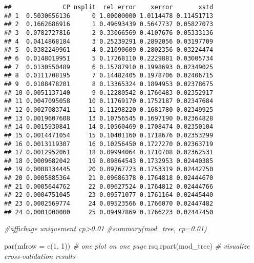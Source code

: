 \documentclass[
]{article}
\newenvironment{Shaded}{\begin{snugshade}}{\end{snugshade}}
\newcommand{\AttributeTok}[1]{\textcolor[rgb]{0.77,0.63,0.00}{#1}}
\newcommand{\CommentTok}[1]{\textcolor[rgb]{0.56,0.35,0.01}{\textit{#1}}}
\newcommand{\DecValTok}[1]{\textcolor[rgb]{0.00,0.00,0.81}{#1}}
\newcommand{\FunctionTok}[1]{\textcolor[rgb]{0.00,0.00,0.00}{#1}}
\newcommand{\NormalTok}[1]{#1}
\newcommand{\SpecialCharTok}[1]{\textcolor[rgb]{0.00,0.00,0.00}{#1}}
\begin{document}
\begin{Shaded}
\end{Shaded}

\begin{verbatim}
##              CP nsplit  rel error    xerror       xstd
## 1  0.5030656136      0 1.00000000 1.0114478 0.11451713
## 2  0.1662686916      1 0.49693439 0.5647737 0.05827073
## 3  0.0782727816      2 0.33066569 0.4107676 0.05333136
## 4  0.0414868184      3 0.25239291 0.2892056 0.03197709
## 5  0.0382249961      4 0.21090609 0.2802356 0.03224474
## 6  0.0148019951      5 0.17268110 0.2229881 0.03005734
## 7  0.0130550489      6 0.15787910 0.1998693 0.02349025
## 8  0.0111708195      7 0.14482405 0.1978706 0.02406715
## 9  0.0108478201      8 0.13365324 0.1894953 0.02378675
## 10 0.0051137140      9 0.12280542 0.1760483 0.02352917
## 11 0.0047095058     10 0.11769170 0.1752187 0.02347684
## 12 0.0027083741     11 0.11298220 0.1681780 0.02349925
## 13 0.0019607608     13 0.10756545 0.1697190 0.02364828
## 14 0.0015930841     14 0.10560469 0.1708474 0.02350104
## 15 0.0014471054     15 0.10401160 0.1718676 0.02353299
## 16 0.0013119307     16 0.10256450 0.1727270 0.02363719
## 17 0.0012952061     18 0.09994064 0.1710708 0.02362531
## 18 0.0009682042     19 0.09864543 0.1732953 0.02440385
## 19 0.0008134445     20 0.09767723 0.1753319 0.02442750
## 20 0.0005885364     21 0.09686378 0.1764818 0.02444670
## 21 0.0005644762     22 0.09627524 0.1764812 0.02444766
## 22 0.0004751045     23 0.09571077 0.1761164 0.02445440
## 23 0.0002569774     24 0.09523566 0.1766070 0.02447482
## 24 0.0001000000     25 0.09497869 0.1766223 0.02447450
\end{verbatim}

\begin{Shaded}
\begin{Highlighting}[]
\CommentTok{\#affichage uniquement cp\textgreater{}0.01}
\CommentTok{\#summary(mod\_tree, cp=0.01)}

\FunctionTok{par}\NormalTok{(}\AttributeTok{mfrow =} \FunctionTok{c}\NormalTok{(}\DecValTok{1}\NormalTok{, }\DecValTok{1}\NormalTok{)) }\CommentTok{\# one plot on one page}
\FunctionTok{rsq.rpart}\NormalTok{(mod\_tree) }\CommentTok{\# visualize cross{-}validation results}
\end{Highlighting}
\end{Shaded}
\end{document}
